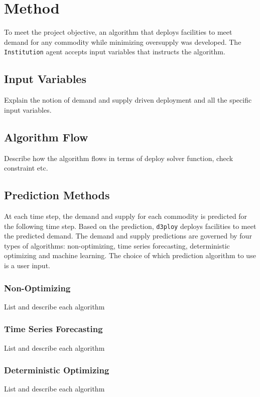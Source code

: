 \documentclass[11pt,letterpaper]{article}
\newcommand{\deploy}{\texttt{d3ploy}\xspace}%
\begin{document}
\section{Method}
To meet the project objective, an algorithm that deploys 
facilities to meet demand for any commodity while 
minimizing oversupply was developed. 
The \texttt{Institution} agent accepts input variables that instructs
the algorithm. 

\subsection{Input Variables}
Explain the notion of demand and supply driven deployment 
and all the specific input variables. 

\subsection{Algorithm Flow}
Describe how the algorithm flows in terms of deploy solver function, 
check constraint etc. 

\subsection{Prediction Methods}
At each time step, the demand and supply for each commodity is 
predicted for the following time step. 
Based on the prediction, \deploy deploys facilities to meet the 
predicted demand. 
The demand and supply predictions are governed by four types
of algorithms: non-optimizing, time series forecasting, 
deterministic optimizing and machine learning. 
The choice of which prediction algorithm to use is a user input. 

\subsubsection{Non-Optimizing}
List and describe each algorithm 

\subsubsection{Time Series Forecasting}
List and describe each algorithm 

\subsubsection{Deterministic Optimizing}
List and describe each algorithm 
\end{document}
